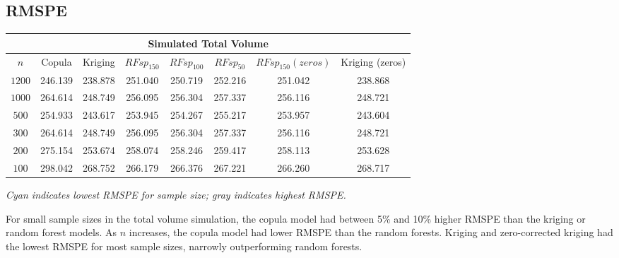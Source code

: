 \documentclass{article}
\begin{document}
\subsection{RMSPE}
\begin{singlespace}
	\begin{center}
	\begin{tabular}{|| c | c c c c c c c ||}
	\hline
	\multicolumn{8}{||c||}{Simulated Total Volume} \\
	\hline
	$n$ & Copula & Kriging & $RFsp_{150}$ & $RFsp_{100}$ & $RFsp_{50}$ & $RFsp_{150}(zeros)$ & Kriging (zeros) \\ [.5ex] 
	\hline\hline
	$1200$ & 246.139 & 238.878 & 251.040 & 250.719 & \cellcolor{gray}252.216 & 251.042 & \cellcolor{cyan}238.868 \\
	$1000$ & \cellcolor{gray}264.614 & 248.749 & 256.095 & 256.304 & 257.337 & 256.116 & \cellcolor{cyan}248.721 \\
	$500$ & 254.933 & 243.617 & 253.945 & 254.267 & \cellcolor{gray}255.217 & 253.957 & \cellcolor{cyan}243.604 \\
	$300$ & \cellcolor{gray}264.614 & 248.749 & 256.095 & 256.304 & 257.337 & 256.116 & \cellcolor{cyan}248.721 \\
	$200$ & \cellcolor{gray}275.154 & 253.674 & 258.074 & 258.246 & 259.417 & 258.113 & \cellcolor{cyan}253.628 \\
	$100$ & \cellcolor{gray}298.042 & 268.752 & \cellcolor{cyan}266.179 & 266.376 & 267.221 & 266.260 & 268.717 \\ [.5ex] 
	\hline
	\end{tabular}
	\vspace{.06cm}

	\textit{Cyan indicates lowest RMSPE for sample size; gray indicates highest RMSPE.}
	\end{center}
\end{singlespace}
For small sample sizes in the total volume simulation, the copula model had between 5\% and 10\% higher RMSPE than the kriging or random forest models.
As $n$ increases, the copula model had lower RMSPE than the random forests.
Kriging and zero-corrected kriging had the lowest RMSPE for most sample sizes, narrowly outperforming random forests.
\end{document}
